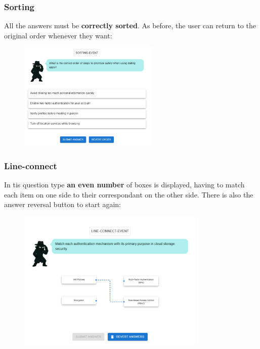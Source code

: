 \subsubsection{Sorting}
All the answers must be \textbf{correctly sorted}. As before, the user can return to the original order whenever they want:
\begin{figure}[htbp]
    \centering
    \includegraphics[width=0.6\textwidth]{images/Sorting.png}
\end{figure}
\pagebreak

\subsubsection{Line-connect}
In tis question type \textbf{an even number} of boxes is displayed, having to match each item on one side to their correspondant
on the other side. There is also the answer reversal button to start again:
\begin{figure}[htbp]
    \centering
    \includegraphics[width=0.8\textwidth]{images/Line_Connect.png}
\end{figure}